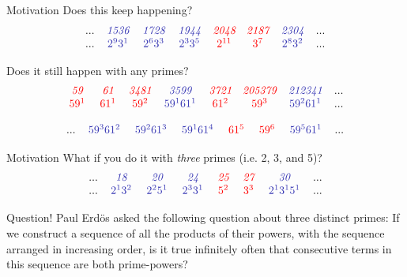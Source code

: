 \documentclass{beamer}
\newcommand{\redtext}[1]{{\textcolor{red}{#1}}}
\newcommand{\bluetext}[1]{{\textcolor{dblue}{#1}}}
\newcommand{\remph}[1]{\redtext{\textit{#1}}}
\newcommand{\blemph}[1]{\bluetext{\textit{#1}}}
\begin{document}
\begin{frame}{Motivation}
    Does this keep happening?
\[\begin{array}{ ccccccccccccccc }
... & \blemph{1536} & \blemph{1728} & \blemph{1944} & \remph{2048} & \remph{2187} & \blemph{2304} & ...\\
... & \blemph{\,$2^9 3^1$\,} & \blemph{\,$2^6 3^3$\,} & \blemph{\,$2^3 3^5$\,} & \remph{\,$2^{11}$\,} & \remph{\,$3^7$\,} & \blemph{\,$2^8 3^2$\,} & ...
\end{array}\]

    Does it still happen with any primes?
    \[\begin{array}{ ccccccccccccccc }
\remph{59} & \remph{61} & \remph{3481} & \blemph{3599} & \remph{3721} & \remph{205379} & \blemph{212341} & ... \\
\remph{\,$59^1$\,} & \remph{\,$61^1$\,} & \remph{\,$59^2$\,} & \blemph{\,$59^1 61^1$\,} & \remph{\,$61^2$\,} & \remph{\,$59^3$\,} & \blemph{\,$59^2 61^1$\,} & ...
\end{array}\]

\[\begin{array}{ ccccccccccccccc }
... & \blemph{\,$59^3 61^2$\,} & \blemph{\,$59^2 61^3$\,} & \blemph{\,$59^1 61^4$\,} & \remph{\,$61^5$\,} & \remph{\,$59^6$\,} & \blemph{\,$59^5 61^1$\,} & ...
\end{array}\]
\end{frame}
\begin{frame}{Motivation}
     What if you do it with \emph{three} primes (i.e. 2, 3, and 5)?
\[\begin{array}{ ccccccccccccccc }
... & \blemph{18} & \blemph{20} & \blemph{24} & \remph{25} & \remph{27} & \blemph{30} & ... \\
... & \blemph{\,$2^1 3^2$\,} & \blemph{\,$2^2 5^1$\,} & \blemph{\,$2^3 3^1$\,} & \remph{\,$5^2$\,} & \remph{\,$3^3$\,} & \blemph{\,$2^1 3^1 5^1$\,} & ...
\end{array}\]
\end{frame}
\begin{frame}{Question!}
    Paul Erd\"os asked the following question about three distinct primes: If we construct a sequence of all the products of their powers, with the sequence arranged in increasing order, is it true infinitely often that consecutive terms in this sequence are both prime-powers? %
\end{frame}
\end{document}
